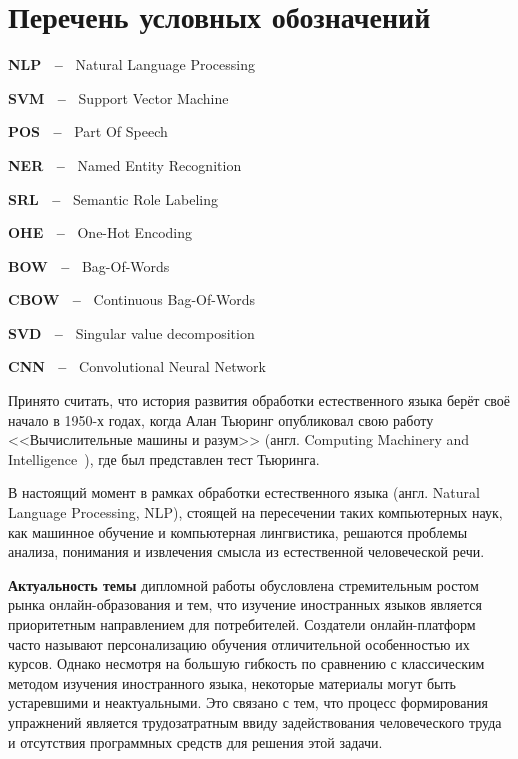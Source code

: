 


\setcounter{secnumdepth}{5}
\setcounter{tocdepth}{5}
\newcommand\simpleparagraph[1]{%
  \stepcounter{paragraph}\paragraph*{\theparagraph\quad{}#1}}
  



\section*{Перечень условных обозначений}
\label{sec:table}

\textbf{NLP ~--~} Natural Language Processing

\textbf{SVM ~--~} Support Vector Machine

\textbf{POS ~--~} Part Of Speech

\textbf{NER ~--~} Named Entity Recognition

\textbf{SRL ~--~} Semantic Role Labeling

\textbf{OHE ~--~} One-Hot Encoding

\textbf{BOW ~--~} Bag-Of-Words

\textbf{CBOW ~--~} Continuous Bag-Of-Words

\textbf{SVD ~--~} Singular value decomposition

\textbf{CNN ~--~} Convolutional Neural Network


\newpage
\Intro
Принято считать, что история развития обработки естественного языка берёт своё начало в 1950-х годах, когда Алан Тьюринг опубликовал свою работу <<Вычислительные машины и разум>> (англ. Computing Machinery and Intelligence~\cite{turing1950computing}), где был представлен тест Тьюринга.

В настоящий момент в рамках обработки естественного языка (англ. Natural Language Processing, NLP), стоящей на пересечении таких компьютерных наук, как машинное обучение и компьютерная лингвистика, решаются проблемы анализа, понимания и извлечения смысла из естественной человеческой речи.

\textbf{Актуальность темы} дипломной работы обусловлена стремительным ростом рынка онлайн-образования и тем, что изучение иностранных языков является приоритетным направлением для потребителей.
Создатели онлайн-платформ часто называют персонализацию обучения отличительной особенностью их курсов. Однако несмотря на большую гибкость по сравнению с классическим методом изучения иностранного языка, некоторые материалы могут быть устаревшими и неактуальными. Это связано с тем, что процесс формирования упражнений является трудозатратным ввиду задействования человеческого труда и отсутствия программных средств для решения этой задачи.

